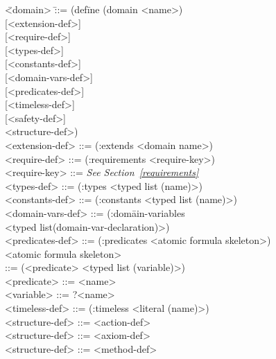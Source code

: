 \begin{nopagebreak}\begin{tabtt}
\bump \= <domain> \bump\bump\=::= (def\=ine (domain <name>)\+\+\+\\
                        {[}<extension-def>]  \\
                        {[}<require-def>]  \\
                        {[}<types-def>] \\
                        {[}<constants-def>] \\
                        {[}<domain-vars-def>] \\
                        {[}<predicates-def>] \\
                        {[}<timeless-def>] \\
                        {[}<safety-def>] \\
                        <structure-def>\zom) \-\-\\
  <extension-def>\> ::= (:extends <domain name>\oom) \\
  <require-def>  \> ::= (:requirements <require-key>\oom) \\
  <require-key>  \> ::= {\em See Section~\ref{requirements}} \\
  <types-def>    \> ::= (:types <typed list (name)>) \\
  <constants-def> \>::= (:constants <typed list (name)>) \\
  <domain-vars-def> \>::= (:dom\=ain-variables \\
                              \>\> <typed list(domain-var-declaration)>) \\
  <predicates-def> \> ::= (:predicates <atomic formula skeleton>\oom) \\
  <atomic formula skeleton> \\
                \> ::= (<predicate> <typed list (variable)>) \\
  <predicate> \> ::= <name> \\
  <variable> \> ::= ?<name> \\
  <timeless-def> \> ::= (:timeless <literal (name)>\oom) \\
  <structure-def> \>::= <action-def>\\
  <structure-def> \>::= <axiom-def> \\
  <structure-def> \>::= <method-def> 
\end{tabtt}\end{nopagebreak}

